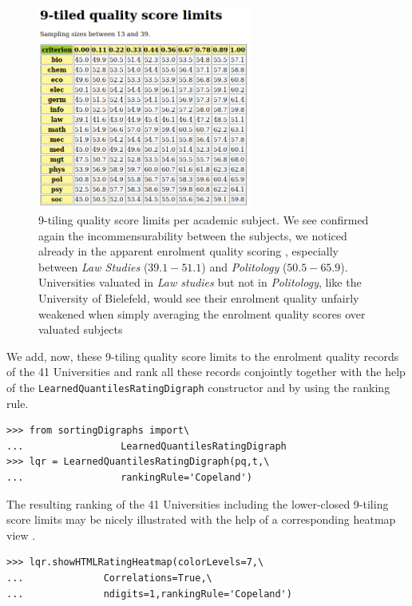 \begin{figure}[h]
\sidecaption
\includegraphics[width=7cm]{Figures/score9Limits.png}
\caption{9-tiling quality score limits per academic subject. We see confirmed again the incommensurability between the subjects, we noticed already in the apparent enrolment quality scoring , especially between \emph{Law Studies} ($39.1 - 51.1$) and \emph{Politology} ($50.5 - 65.9$). Universities valuated in \emph{Law studies} but not in \emph{Politology}, like the University of Bielefeld, would see their enrolment quality unfairly weakened when simply averaging the enrolment quality scores over valuated subjects}
\label{fig:14.3}       %
\end{figure}
We add, now, these 9-tiling quality score limits to the enrolment quality records of the 41 Universities and rank all these records conjointly together with the help of the \texttt{LearnedQuantilesRatingDigraph} constructor and by using the \Copeland ranking rule.

\begin{lstlisting}
>>> from sortingDigraphs import\
...                 LearnedQuantilesRatingDigraph
>>> lqr = LearnedQuantilesRatingDigraph(pq,t,\
...                 rankingRule='Copeland')
\end{lstlisting}

The resulting ranking of the 41 Universities including the lower-closed 9-tiling score limits may be nicely illustrated  with the help of a corresponding heatmap view . 

\begin{lstlisting}
>>> lqr.showHTMLRatingHeatmap(colorLevels=7,\
...              Correlations=True,\
...              ndigits=1,rankingRule='Copeland')
\end{lstlisting}

